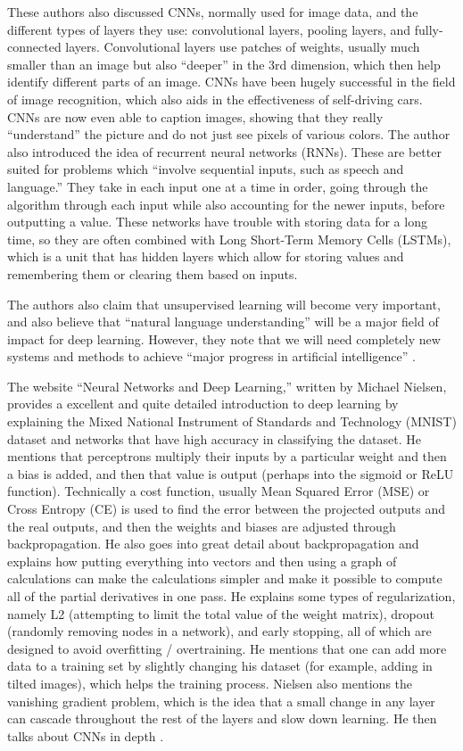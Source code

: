 \documentclass[]{report}
\begin{document}
These authors also discussed CNNs, normally used for image data, and the different types of layers they use: convolutional layers, pooling layers, and fully-connected layers. Convolutional layers use patches of weights, usually much smaller than an image but also “deeper” in the 3rd dimension, which then help identify different parts of an image. CNNs have been hugely successful in the field of image recognition, which also aids in the effectiveness of self-driving cars. CNNs are now even able to caption images, showing that they really “understand” the picture and do not just see pixels of various colors.
The author also introduced the idea of recurrent neural networks (RNNs). These are better suited for problems which “involve sequential inputs, such as speech and language.” They take in each input one at a time in order, going through the algorithm through each input while also accounting for the newer inputs, before outputting a value. These networks have trouble with storing data for a long time, so they are often combined with Long Short-Term Memory Cells (LSTMs), which is a unit that has hidden layers which allow for storing values and remembering them or clearing them based on inputs.

The authors also claim that unsupervised learning will become very important, and also believe that “natural language understanding” will be a major field of impact for deep learning. However, they note that we will need completely new systems and methods to achieve “major progress in artificial intelligence” \cite{ThreeGiants}.


The website “Neural Networks and Deep Learning,” written by Michael Nielsen, provides a excellent and quite detailed introduction to deep learning by explaining the Mixed National Instrument of Standards and Technology (MNIST) dataset and networks that have high accuracy in classifying the dataset. He mentions that perceptrons multiply their inputs by a particular weight and then a bias is added, and then that value is output (perhaps into the sigmoid or ReLU function). Technically a cost function, usually Mean Squared Error (MSE) or Cross Entropy (CE) is used to find the error between the projected outputs and the real outputs, and then the weights and biases are adjusted through backpropagation. He also goes into great detail about backpropagation and explains how putting everything into vectors and then using a graph of calculations can make the calculations simpler and make it possible to compute all of the partial derivatives in one pass. He explains some types of regularization, namely L2 (attempting to limit the total value of the weight matrix), dropout (randomly removing nodes in a network), and early stopping, all of which are designed to avoid overfitting / overtraining. He mentions that one can add more data to a training set by slightly changing his dataset (for example, adding in tilted images), which helps the training process. Nielsen also mentions the vanishing gradient problem, which is the idea that a small change in any layer can cascade throughout the rest of the layers and slow down learning. He then talks about CNNs in depth \cite{NNDL}.
\end{document}
